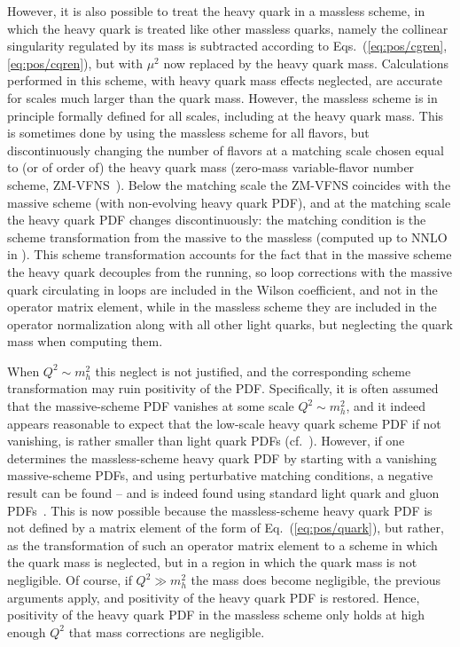 However, it is also possible to treat the heavy quark in a massless \msbar{}
scheme, in which the heavy quark is treated like other massless
quarks, namely the collinear singularity regulated by its mass is
subtracted  according to Eqs.~(\ref{eq:pos/cgren},\ref{eq:pos/cqren}), but with
$\mu^2$ now replaced by the heavy quark mass. Calculations performed
in this scheme, with heavy quark mass effects neglected, are accurate
for scales much larger than the quark mass.  
However,  the massless scheme is in principle formally defined for all scales,
including at the heavy quark mass. This is sometimes done by using the
massless scheme for all flavors, but discontinuously changing the
number of flavors at a matching scale chosen equal to (or of order of) the
heavy quark mass (zero-mass variable-flavor number scheme,
ZM-VFNS~\cite{Aivazis:1993pi}). Below the matching scale the ZM-VFNS
coincides with the massive scheme (with non-evolving heavy quark PDF),
and at the matching scale the heavy quark PDF
changes discontinuously:  the matching condition is the scheme transformation
from the massive to the massless \msbar{} (computed up to NNLO in
\cite{Buza:1996wv}). This scheme transformation accounts for the
fact that in the massive scheme the heavy quark decouples from the
running, so
loop corrections with the massive
quark circulating in loops are included in the Wilson coefficient,
and not in the operator matrix element, while in the massless scheme
they are included in the operator normalization along with all other
light quarks, but neglecting the quark mass when computing them.

When $Q^2\sim m_h^2$ this neglect is not justified, and the corresponding
scheme transformation may ruin positivity of the PDF. Specifically, it
is often assumed that the massive-scheme PDF vanishes at some scale  $Q^2\sim m_h^2$,
and it indeed appears
reasonable to expect that the low-scale heavy quark scheme PDF if not vanishing, is rather smaller than
light quark PDFs (cf.\
\cite{Ball:2015dpa,Ball:2016neh}). However, if one determines the 
massless-scheme
heavy quark PDF by starting with a vanishing massive-scheme PDFs, and
using perturbative  matching conditions, a negative result can be found
-- and is 
indeed found using standard light quark and gluon
PDFs~\cite{Ball:2017nwa}. This is now possible because the
massless-scheme heavy quark
PDF is not defined by a matrix element of the form of
Eq.~(\ref{eq:pos/quark}), but rather, as the transformation of such an
operator matrix element to a scheme in which the quark mass is
neglected, but in a region in which the quark mass is not negligible.
Of course, if  $Q^2\gg m_h^2$ the mass does become negligible, the
previous arguments apply, and
positivity of the heavy quark PDF is restored. Hence, positivity of
the heavy quark PDF in the massless scheme only holds at high enough
$Q^2$ that mass corrections are negligible.
 
